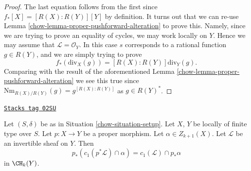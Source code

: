 \begin{proof}

The last equation follows from the first since $f_*[X] = [R(X) : R(Y)][Y]$
by definition. It turns out that we can re-use
Lemma \ref{chow-lemma-proper-pushforward-alteration}
to prove this. Namely, since we are trying to prove an equality
of cycles, we may work locally on $Y$. Hence we may assume
that $\mathcal{L} = \mathcal{O}_Y$. In this case $s$
corresponds to a rational function $g \in R(Y)$, and
we are simply trying to prove
$$
f_*\left(\text{div}_X(g)\right) =
[R(X) : R(Y)]\text{div}_Y(g).
$$
Comparing with the result of the aforementioned
Lemma \ref{chow-lemma-proper-pushforward-alteration}
we see this true since
$\text{Nm}_{R(X)/R(Y)}(g) = g^{[R(X) : R(Y)]}$
as $g \in R(Y)^*$.
\end{proof}

\begin{lemma}
\label{chow-lemma-pushforward-cap-c1}
\href{https://stacks.math.columbia.edu/tag/02SU}{\texttt{Stacks tag 02SU}}

Let $(S, \delta)$ be as in Situation \ref{chow-situation-setup}.
Let $X$, $Y$ be locally of finite type over $S$.
Let $p : X \to Y$ be a proper morphism.
Let $\alpha \in Z_{k + 1}(X)$.
Let $\mathcal{L}$ be an invertible sheaf on $Y$.
Then
$$
p_*(c_1(p^*\mathcal{L}) \cap \alpha) = c_1(\mathcal{L}) \cap p_*\alpha
$$
in $\CH_k(Y)$.
\end{lemma}

